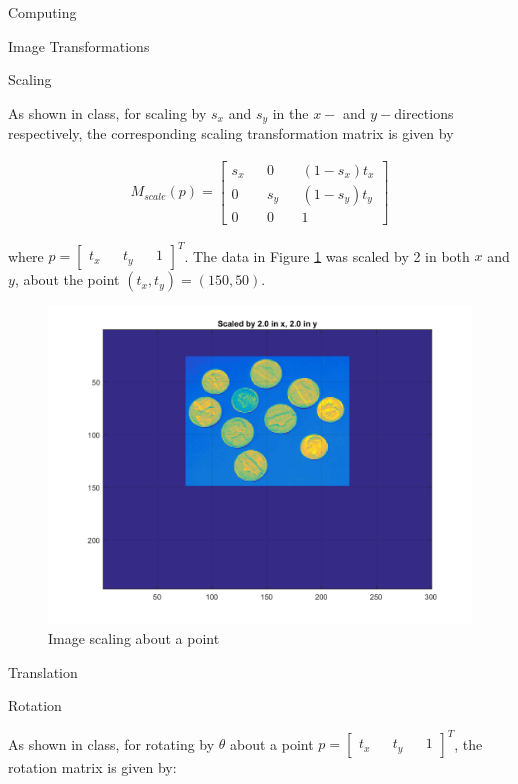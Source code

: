 \begin{section}{Computing}
\begin{homeworkSection}{Image Transformations}
\begin{subsubsection}{Scaling}

As shown in class, for scaling by $s_x$ and $s_y$ in the $x-$ and $y-$directions respectively, the corresponding scaling transformation matrix is given by

\begin{align*}
    M_{scale}(p) = \begin{bmatrix} s_x && 0 && (1-s_x)t_x \\
        0 && s_y && (1-s_y)t_y \\
        0 && 0 && 1 \end{bmatrix}
\end{align*}

where $p = \begin{bmatrix} t_x && t_y && 1 \end{bmatrix}^T$. 
The data in Figure \ref{fig:scaled} was scaled by 2 in both $x$ and $y$, about the point $(t_x, t_y) = (150, 50)$. 

\begin{figure}[!h]
\centering
\includegraphics[width=0.75\columnwidth]{../data/scaled} %
\caption{Image scaling about a point}
\label{fig:scaled}
\end{figure}
\end{subsubsection}


\begin{subsubsection}{Translation}
\end{subsubsection}


\begin{subsubsection}{Rotation}

As shown in class, for rotating by $\theta$ about a point $p = \begin{bmatrix} t_x && t_y && 1 \end{bmatrix}^T$, the rotation matrix is given by:


\end{subsubsection}
\end{homeworkSection}
\end{section}
